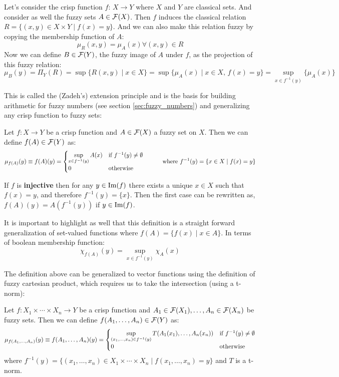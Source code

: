 Let's consider the crisp function $f:\,X \longrightarrow Y$ where $X$ and $Y$ are classical sets. And consider as well the fuzzy sets $A \in \mathcal{F}(X)$. Then $f$ induces the classical relation $R=\{(x,y)\in X\times Y \mid f(x)=y\}$. And we can also make this relation fuzzy by copying the membership function of $A$:
$$ \mu_R (x,y) = \mu_A (x) \forall (x,y)\in R$$
Now we can define $B\in\mathcal{F}(Y)$, the fuzzy image of $A$ under $f$, as the projection of this fuzzy relation:
$$\mu_B (y) = \Pi_Y (R) = \sup\{R(x,y)\mid x\in X\} = \sup\{\mu_A (x)\mid x\in X, \, f(x)= y\} = \sup_{x\in f^{-1}(y)}\{\mu_A(x)\}$$

This is called the (Zadeh's) extension principle and is the basis for building arithmetic for fuzzy numbers (see section \ref{sec:fuzzy_numbers}) and generalizing any crisp function to fuzzy sets: 

\begin{definition}
  Let $f: X \longrightarrow Y$ be a crisp function and $A\in \mathcal{F}(X)$ a fuzzy set on $X$. Then we can define $f(A)\in \mathcal{F}(Y)$ as:
  \[
  \mu_{f(A)}(y)\equiv f(A)(y) = 
  \begin{cases}
    \sup_{x\in f^{-1}(y)}A(x) & \textnormal{if } f^{-1}(y)\neq \emptyset\\
    0 & \textnormal{otherwise}
  \end{cases}
  \quad\quad\quad \textnormal{where } f^{-1}(y)=\{x\in X \mid f(x)=y\}
  \]
\end{definition}


\begin{remark}
  If $f$ is \textbf{injective} then for any $y \in \textnormal{Im}(f)$ there exists a unique $x \in X$ such that $f(x)=y$, and therefore $f^{-1}(y)=\{x\}$. Then the first case can be rewritten as, $f(A)(y) = A(f^{-1}(y))$ if $y \in \textnormal{Im}(f)$.
\end{remark}

It is important to highlight as well that this definition is a straight forward generalization of set-valued functions where $f(A)= \{f(x)\mid x\in A\}$. In terms of boolean membership function:
$$\chi _{f(A)}(y)=\sup_{x\in f^{-1}(y)}\chi_A(x)$$

The definition above can be generalized to vector functions using the definition of fuzzy cartesian product, which requires us to take the intersection (using a t-norm):

\begin{definition}
  Let $f: X_1 \times \cdots \times X_n \longrightarrow Y$ be a crisp function and $A_1 \in \mathcal{F}(X_1), \ldots, A_n \in \mathcal{F}(X_n)$ be fuzzy sets. Then we can define $f(A_1,\ldots,A_n)\in \mathcal{F}(Y)$ as:
  \[
  \mu_{f(A_1,\ldots,A_n)}(y)\equiv f(A_1,\ldots,A_n)(y) = 
  \begin{cases}
    \sup_{(x_1,\ldots,x_n)\in f^{-1}(y)} T(A_1(x_1),\ldots,A_n(x_n)) & \textnormal{if } f^{-1}(y)\neq \emptyset\\
    0 & \textnormal{otherwise}
  \end{cases}
  \]
  where $f^{-1}(y)=\{(x_1,\ldots,x_n)\in X_1\times\cdots\times X_n \mid f(x_1,\ldots,x_n)=y\}$ and $T$ is a t-norm.
\end{definition}

